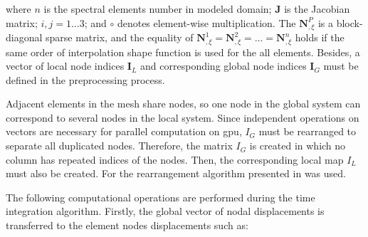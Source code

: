 where $n$ is the spectral elements number in modeled domain; \textbf{J} is the Jacobian matrix; $i,j=1\ldots3$; and $\circ$ denotes element-wise multiplication.
The $\textbf{N}^P_{,\xi}$ is a block-diagonal sparse matrix, and the equality of $\textbf{N}^1_{,\xi}=\textbf{N}^2_{,\xi}=\ldots=\textbf{N}^n_{,\xi}$ holds if the same order of interpolation shape function is used for the all elements.
Besides, a vector of local node indices $\textbf{I}_L$ and corresponding global node indices $\textbf{I}_G$ must be defined in the preprocessing process.

Adjacent elements in the mesh share nodes, so one node in the global system can correspond to several nodes in the local system. Since independent operations on vectors are necessary for parallel computation on \ac{gpu}, $I_{G}$ must be rearranged to separate all duplicated nodes. Therefore, the matrix $I_{G}$ is created in which no column has repeated indices of the nodes. Then, the corresponding local map $I_{L}$ must also be created. For the rearrangement algorithm presented in \cite{kudela2016parallel} was used.

The following computational operations are performed during the time integration algorithm. Firstly, the global vector of nodal displacements is transferred to the element nodes displacements such as:


